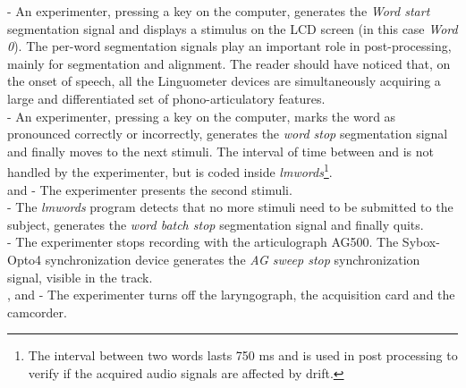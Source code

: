  - An experimenter, pressing a key on the  computer, 
generates the  \emph{Word start} segmentation signal and displays a stimulus
on the LCD screen (in this case \emph{Word 0}).
The per-word segmentation signals play an important role in post-processing,
mainly for segmentation and alignment.
The reader should have noticed that, on the onset of speech, all the Linguometer
devices are simultaneously acquiring a large and differentiated set of 
phono-articulatory features.\\

 - An experimenter, pressing a key on the  computer, 
marks the word as pronounced correctly or incorrectly, generates the
\emph{word stop}
segmentation signal and finally moves to the next stimuli.
The interval of time between  and  is not handled
by the experimenter, but is coded inside
\emph{lmwords}\footnote{The interval between two words lasts 750 ms and is
used in post processing to verify if the acquired audio signals are affected by 
drift.}.\\

 and  - The experimenter presents the second 
stimuli.\\

 - The \emph{lmwords} program detects that no more stimuli need to be 
submitted to the subject, generates the \emph{word batch stop} segmentation
signal
and finally quits.\\

 - The experimenter stops recording with the articulograph AG500. 
The Sybox-Opto4 synchronization device generates the \emph{AG sweep stop}
synchronization signal, visible in the  track.\\

,  and  - The experimenter turns off the
laryngograph,
the acquisition card and the
camcorder.\\

